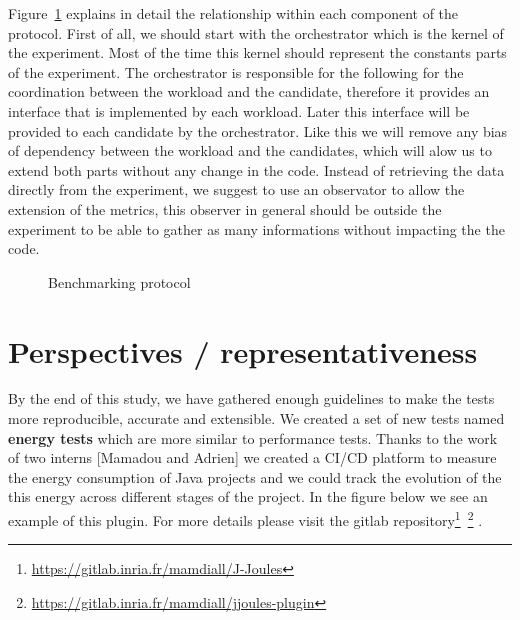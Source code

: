 Figure~\ref{fig:benchmarkingprotocol} explains in detail the relationship within each component of the protocol. 
First of all, we should start with the orchestrator which is the kernel of the experiment. Most of the time this kernel should represent the constants parts of the experiment. 
The orchestrator is responsible for the following  for the coordination between the workload and the candidate, therefore it provides an interface that is implemented by each workload. 
Later this interface will be provided to each candidate by the orchestrator. Like this we will remove any bias of dependency between the workload and the candidates, which will alow us to extend both parts without any change in the code. 
Instead of retrieving the data directly from the experiment, we suggest to use an observator to allow the extension of the metrics, this observer in general should be outside the experiment to be able to gather as many informations without impacting the the code.  
\begin{figure}[!htb]
    \caption{Benchmarking protocol}\label{fig:benchmarkingprotocol}
\end{figure}



\section{Perspectives / representativeness}
By the end of this study, we have gathered enough guidelines to make the tests more reproducible, accurate and extensible.
We created a set of new tests named \textbf{energy tests} which are more similar to performance tests.
Thanks to the work of two interns [Mamadou and Adrien] we created a CI/CD platform to measure the energy consumption of Java projects and we could track the evolution of the this energy across different stages of the project.
In the figure below we see an example of this plugin.
For more details please visit the gitlab repository\footnote{\url{https://gitlab.inria.fr/mamdiall/J-Joules}}~\footnote{\url{https://gitlab.inria.fr/mamdiall/jjoules-plugin}} .

